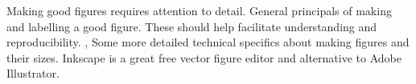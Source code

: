 








    {Making good figures requires attention to detail.} %
    {{
        {General principals of making and labelling a good figure. These should help facilitate understanding and reproducibility. }, %
        {Some more detailed technical specifics about making figures and their sizes. Inkscape is a great free vector figure editor and alternative to Adobe Illustrator.\captionTips} %
    }}
    
